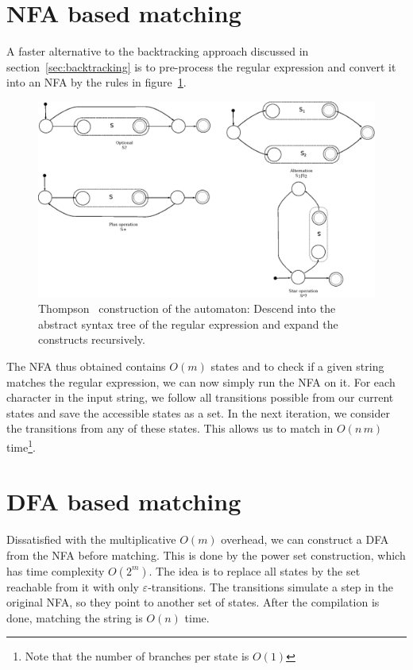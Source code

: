 \documentclass[11pt,a4paper,twoside,openright]{Thesis}
\theoremstyle{definition}
\newcommand{\Figref}[1]{figure~\ref{fig:#1}}
\newcommand{\Secref}[1]{section~\ref{sec:#1}}
\begin{document}
\section{NFA based matching}\label{sec:nfa-match}
A faster alternative to the backtracking approach discussed in
\Secref{backtracking} is to pre-process the regular expression and convert it
into an NFA by the rules in \Figref{thompson-construction-simple}.

\begin{figure}[htb] \includegraphics[width=\linewidth]{graphs/thompson-simple}
  \caption[Thompson construction]{\label{thompson-simple}Thompson~\cite{Thom68a} construction of the
automaton: Descend into the abstract syntax tree of the regular
expression and expand the constructs recursively.}
\label{fig:thompson-construction-simple}
\end{figure}

The NFA thus obtained contains $O(m)$ states and to check if a given string
matches the regular expression, we can now simply run the NFA on it. For each
character in the input string, we follow all transitions possible from our
current states and save the accessible states as a set. In the next
iteration, we consider the transitions from any of these states. This allows
us to match in $O(n\, m)$ time\footnote{Note that the number of branches per 
state is $O(1)$}.

\section{DFA based matching}\label{sec:dfa-match}
Dissatisfied with the multiplicative $O(m)$ overhead, we can construct a DFA
from the NFA before matching. This is done by the power set
construction\cite{Sips05a}, which has time complexity $O(2^m)$. The idea is to
replace all states by the set reachable from it with only
$\varepsilon$-transitions. The transitions simulate a step in the original NFA,
so they point to another set of states.  After the compilation is done,
matching the string is $O(n)$ time.
\end{document}
